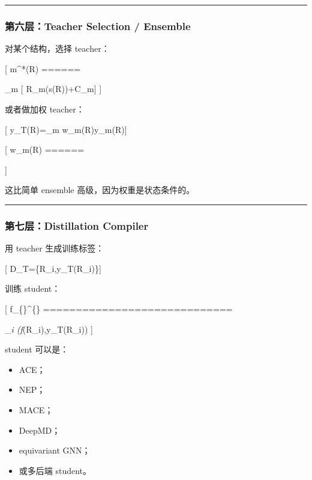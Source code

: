 \documentclass[
  12pt,
]{ctexart}
\providecommand{\tightlist}{%
  \setlength{\itemsep}{0pt}\setlength{\parskip}{0pt}}
\begin{document}
\begin{center}\rule{0.5\linewidth}{0.5pt}\end{center}

\subsubsection{第六层：Teacher Selection /
Ensemble}\label{ux7b2cux516dux5c42teacher-selection-ensemble}

对某个结构，选择 teacher：

{[} m\^{}*(R) ======

\arg\min\_m {[} \widehat R\_m(s(R))+\lambda C\_m{]} {]}

或者做加权 teacher：

{[} y\_T(R)=\sum\_m w\_m(R)y\_m(R){]}

{[} w\_m(R) ======


{]}

这比简单 ensemble 高级，因为权重是状态条件的。

\begin{center}\rule{0.5\linewidth}{0.5pt}\end{center}

\subsubsection{第七层：Distillation
Compiler}\label{ux7b2cux4e03ux5c42distillation-compiler}

用 teacher 生成训练标签：

{[} \mathcal D\_T=\{R\_i,y\_T(R\_i)\}{]}

训练 student：

{[} f\_\{\theta\}\^{}\{\} =============================

\arg\min\_\theta \sum\emph{i \ell(f}\theta(R\_i),y\_T(R\_i)) {]}

student 可以是：

\begin{itemize}
\tightlist
\item
  ACE；
\item
  NEP；
\item
  MACE；
\item
  DeepMD；
\item
  equivariant GNN；
\item
  或多后端 student。
\end{itemize}
\end{document}
